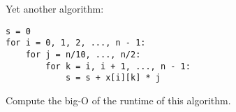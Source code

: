Yet another algorithm:
\begin{Verbatim}[frame=single, fontsize=\small]
s = 0
for i = 0, 1, 2, ..., n - 1:
    for j = n/10, ..., n/2:
        for k = i, i + 1, ..., n - 1:
            s = s + x[i][k] * j
\end{Verbatim}
Compute the big-O of the runtime of this algorithm.
